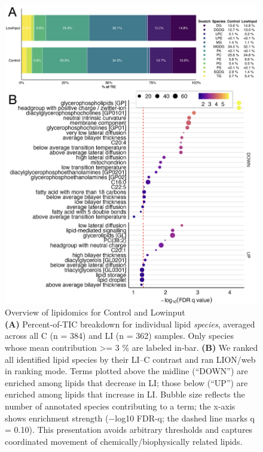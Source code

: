 \documentclass[10pt,letterpaper]{article}
\begin{document}
\begin{itemize}
\begin{figure}[htbp]
  \centering
  \includegraphics[width=\textwidth]{fig/main/Fig1.png}

    \caption{Overview of lipidomics for Control and Lowinput \\
    \textbf{(A)} Percent‐of‐TIC breakdown for individual lipid \emph{species}, averaged across all C (n = 384) and LI (n = 362) samples. Only species whose mean contribution >= 3 \% are labeled in‐bar.  
    \textbf{(B)} We ranked all identified lipid species by their LI–C contrast and ran LION/web in ranking mode. Terms plotted above the midline (“DOWN”) are enriched among lipids that decrease in LI; those below (“UP”) are enriched among lipids that increase in LI. Bubble size reflects the number of annotated species contributing to a term; the x-axis shows enrichment strength (−log10 FDR-q; the dashed line marks q = 0.10). This presentation avoids arbitrary thresholds and captures coordinated movement of chemically/biophysically related lipids.}
    
  \label{fig:Fig1_lipid_class}
\end{figure}


\end{itemize}
\end{document}
